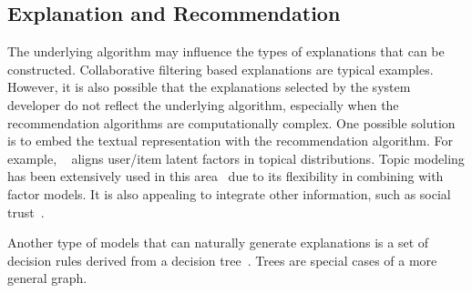 \documentclass{article}
\begin{document}
\subsection{Explanation and Recommendation}
The underlying algorithm may influence the types of explanations that can be constructed. Collaborative filtering based explanations are typical examples. However, it is also possible that the explanations selected by the system developer do not reflect the underlying algorithm, especially when the recommendation algorithms are computationally complex. One possible solution is to embed the textual representation with the recommendation algorithm. For example, ~\cite{McAuley2013Hidden} aligns user/item latent factors in topical distributions. Topic modeling has been extensively used in this area~\cite{Zhang2014Explicit,He2015Trirank} due to its flexibility in combining with factor models. It is also appealing to integrate other information, such as social trust~\cite{Ren2017Social}.

Another type of models that can naturally generate explanations is a set of decision rules derived from a decision tree~\cite{Wang2018Tem}. Trees are special cases of a more general graph. 




\end{document}
